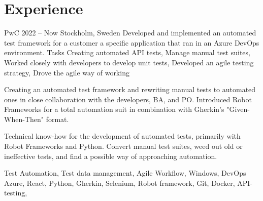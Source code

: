 \documentclass{sobCV}[2015/09/08]
\begin{document}
\section{Experience}
   {PwC}
   {2022 -- Now}
   {Stockholm, Sweden}{
       Developed and implemented an automated test framework for a customer
       a specific application that ran in an Azure DevOps environment.
   }
   {Tasks}{
       Creating automated API tests, 
       Manage manual test suites,
       Worked closely with developers to develop unit tests,
       Developed an agile testing strategy,
       Drove the agile way of working 
 }{  %
      {

         Creating an automated test framework and rewriting manual tests to
         automated ones in close collaboration with the developers, BA, and
         PO. Introduced Robot Frameworks for a total automation suit in
         combination with Gherkin's "Given-When-Then" format. 

         Technical know-how for the development of automated tests, primarily
         with Robot Frameworks and Python. Convert manual test suites, weed
         out old or ineffective tests, and find a possible way of
         approaching automation. 

     }
 }{
       Test Automation,
       Test data management,
       Agile Workflow, 
       Windows, 
       DevOps Azure, 
       React, 
       Python, 
       Gherkin, 
       Selenium, 
       Robot framework,
       Git, 
       Docker, 
       API-testing, 

}
\end{document}

